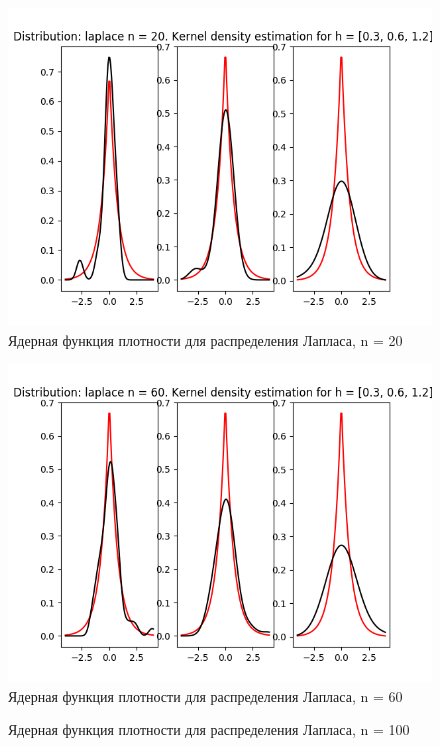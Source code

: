 \documentclass[12pt]{article}
\begin{document}
\begin{center}
    \begin{figure}[H]
 \caption{Ядерная функция плотности для распределения Лапласа, n = 20}
\includegraphics[width=\textwidth]{kernel/d_laplace20.png}
\end{figure}
    \begin{figure}[H]
 \caption{Ядерная функция плотности для распределения Лапласа, n = 60}
\includegraphics[width=\textwidth]{kernel/d_laplace60.png}
\end{figure}
    \begin{figure}[H]
 \caption{Ядерная функция плотности для распределения Лапласа, n = 100}

\end{figure}
\end{center}
\end{document}

